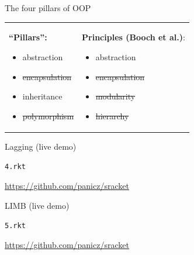 \documentclass{beamer}
\begin{document}
\begin{frame}{The four pillars of OOP}
  \begin{tabularx}{\textwidth}{ X X }
    \textbf{``Pillars'':} \newline
    \begin{itemize}
    \item abstraction
    \item \sout{encapsulation}
    \item inheritance
    \item \sout{polymorphism}
    \end{itemize}
    &
    \textbf{Principles (Booch et al.)}: \newline
    \begin{itemize}
    \item abstraction
    \item \sout{encapsulation}
    \item \sout{modularity}
    \item \sout{hierarchy}
    \end{itemize}
  \end{tabularx}
\end{frame}






\begin{frame}{Lagging (live demo)}
  \begin{center}
    \Huge
    \texttt{4.rkt}
  \end{center}
  \url{https://github.com/panicz/sracket}
\end{frame}




\begin{frame}{LIMB (live demo)}
  \begin{center}
    \Huge
    \texttt{5.rkt}
  \end{center}
  \url{https://github.com/panicz/sracket}
\end{frame}
\end{document}
